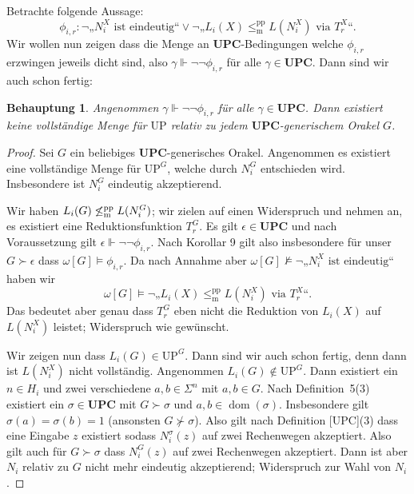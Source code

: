 \documentclass[nofonts]{uebung}
\newtheorem{claim}[theorem]{Behauptung}
\def\UP{\ensuremath{\mathrm{UP}}}
\DeclareMathOperator{\dom}{dom}
\def\leqmpp{\ensuremath{\leq_\mathrm{m}^\mathrm{pp}}}
\begin{document}
Betrachte folgende Aussage:
\[ \phi_{i,r}\colon \neg\text{„$N_i^X$ ist eindeutig“} \lor \neg„L_{i}(X)\leqmpp L(N_i^X)\text{ via }T^X_r“. \]
Wir wollen nun zeigen dass die Menge an $\mathbf{UPC}$-Bedingungen welche $\phi_{i,r}$ erzwingen jeweils dicht sind, also $\gamma\Vdash\neg\neg\phi_{i,r}$ für alle $\gamma\in\mathbf{UPC}$.
Dann sind wir auch schon fertig:

\begin{claim}
    Angenommen $\gamma\Vdash\neg\neg\phi_{i,r}$ für alle $\gamma\in\mathbf{UPC}$.
    Dann existiert keine vollständige Menge für $\UP$ relativ zu jedem $\mathbf{UPC}$-generischem Orakel $G$.
\end{claim}
\begin{proof}
    Sei $G$ ein beliebiges $\mathbf{UPC}$-generisches Orakel.
    Angenommen es existiert eine vollständige Menge für $\UP^G$, welche durch $N^G_i$ entschieden wird.
    Insbesondere ist $N^G_i$ eindeutig akzeptierend.

    Wir haben $L_i(G)\not\leqmpp L(N^G_i)$; wir zielen auf einen Widerspruch und nehmen an, es existiert eine Reduktionsfunktion $T_r^G$.
    Es gilt $\epsilon\in\mathbf{UPC}$ und nach Voraussetzung gilt $\epsilon\Vdash\neg\neg\phi_{i,r}$.
    Nach Korollar 9 gilt also insbesondere für unser $G\succ\epsilon$ dass $\omega[G] \vDash \phi_{i, r}$.
    Da nach Annahme aber $\omega[G] \not\vDash \neg\text{„$N_i^X$ ist eindeutig“}$ haben wir
    \[ \omega[G] \vDash  \neg„L_{i}(X)\leqmpp L(N_i^X)\text{ via }T^X_r“. \]
    Das bedeutet aber genau dass $T^G_r$ eben nicht die Reduktion von $L_{i}(X)$ auf $L(N_i^X)$ leistet; Widerspruch wie gewünscht.

    Wir zeigen nun dass $L_i(G)\in\UP^G$. Dann sind wir auch schon fertig, denn dann ist $L(N_i^X)$ nicht vollständig.
    Angenommen $L_i(G)\not\in\UP^G$. Dann existiert ein $n\in H_i$ und zwei verschiedene $a,b\in\Sigma^n$ mit $a,b\in G$.
    Nach Definition~5(3) existiert ein $\sigma\in\mathbf{UPC}$ mit $G\succ \sigma$ und $a,b\in\dom(\sigma)$.
    Insbesondere gilt $\sigma(a)=\sigma(b)=1$ (ansonsten $G\not\succ\sigma$).
    Also gilt nach Definition [UPC](3) dass eine Eingabe $z$ existiert sodass $N_i^\sigma(z)$ auf zwei Rechenwegen akzeptiert. 
    Also gilt auch für $G\succ\sigma$ dass $N_i^G(z)$ auf zwei Rechenwegen akzeptiert.
    Dann ist aber $N_i$ relativ zu $G$ nicht mehr eindeutig akzeptierend; Widerspruch zur Wahl von $N_i$.
\end{proof}
\end{document}
